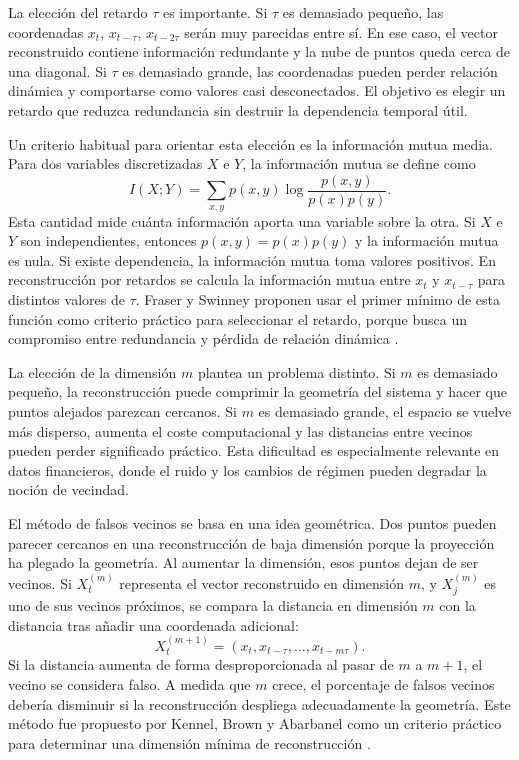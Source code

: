 La elección del retardo \(\tau\) es importante. Si \(\tau\) es demasiado pequeño, las coordenadas \(x_t\), \(x_{t-\tau}\), \(x_{t-2\tau}\) serán muy parecidas entre sí. En ese caso, el vector reconstruido contiene información redundante y la nube de puntos queda cerca de una diagonal. Si \(\tau\) es demasiado grande, las coordenadas pueden perder relación dinámica y comportarse como valores casi desconectados. El objetivo es elegir un retardo que reduzca redundancia sin destruir la dependencia temporal útil.

Un criterio habitual para orientar esta elección es la información mutua media. Para dos variables discretizadas \(X\) e \(Y\), la información mutua se define como
\begin{equation}
    I(X;Y)=\sum_{x,y}p(x,y)\log\frac{p(x,y)}{p(x)p(y)}.
\end{equation}
Esta cantidad mide cuánta información aporta una variable sobre la otra. Si \(X\) e \(Y\) son independientes, entonces \(p(x,y)=p(x)p(y)\) y la información mutua es nula. Si existe dependencia, la información mutua toma valores positivos. En reconstrucción por retardos se calcula la información mutua entre \(x_t\) y \(x_{t-\tau}\) para distintos valores de \(\tau\). Fraser y Swinney proponen usar el primer mínimo de esta función como criterio práctico para seleccionar el retardo, porque busca un compromiso entre redundancia y pérdida de relación dinámica \cite{fraser1986}.

La elección de la dimensión \(m\) plantea un problema distinto. Si \(m\) es demasiado pequeño, la reconstrucción puede comprimir la geometría del sistema y hacer que puntos alejados parezcan cercanos. Si \(m\) es demasiado grande, el espacio se vuelve más disperso, aumenta el coste computacional y las distancias entre vecinos pueden perder significado práctico. Esta dificultad es especialmente relevante en datos financieros, donde el ruido y los cambios de régimen pueden degradar la noción de vecindad.

El método de falsos vecinos se basa en una idea geométrica. Dos puntos pueden parecer cercanos en una reconstrucción de baja dimensión porque la proyección ha plegado la geometría. Al aumentar la dimensión, esos puntos dejan de ser vecinos. Si \(X_t^{(m)}\) representa el vector reconstruido en dimensión \(m\), y \(X_j^{(m)}\) es uno de sus vecinos próximos, se compara la distancia en dimensión \(m\) con la distancia tras añadir una coordenada adicional:
\begin{equation}
    X_t^{(m+1)}=\left(x_t,x_{t-\tau},\ldots,x_{t-m\tau}\right).
\end{equation}
Si la distancia aumenta de forma desproporcionada al pasar de \(m\) a \(m+1\), el vecino se considera falso. A medida que \(m\) crece, el porcentaje de falsos vecinos debería disminuir si la reconstrucción despliega adecuadamente la geometría. Este método fue propuesto por Kennel, Brown y Abarbanel como un criterio práctico para determinar una dimensión mínima de reconstrucción \cite{kennel1992}.

